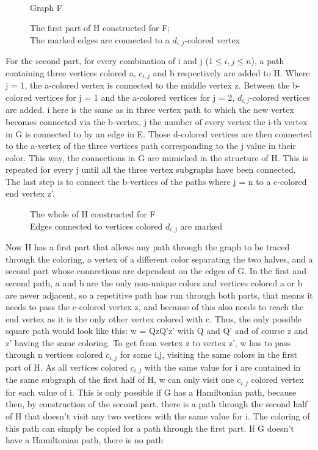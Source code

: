 \documentclass[12pt,a4paper]{article}
\begin{document}
\begin{figure}[h]
\begin{minipage}{0.2\linewidth}
	
	\caption{\\Graph F}
\end{minipage}
\begin{minipage}{0.8\linewidth}
	
	\caption{The first part of H constructed for F; \\The marked edges are connected to a $d_{i,j}$-colored vertex}
\end{minipage}
\end{figure}
\newline
 For the second part, for every combination of i and j ($1 \leq i, j \leq n$), a path containing three vertices colored a, $c_{i,j}$ and b respectively are added to H. Where j = 1, the a-colored vertex is connected to the middle vertex z. Between the b-colored vertices for j = 1 and the a-colored vertices for j = 2, $d_{i,j}$-colored vertices are added. i here is the same as in three vertex path to which the new vertex becomes connected via the b-vertex, j the number of every vertex the i-th vertex in G is connected to by an edge in E. Those d-colored vertices are then connected to the a-vertex of the three vertices path corresponding to the j value in their color. This way, the connections in G are mimicked in the structure of H. This is repeated for every j until all the three vertex subgraphs have been connected. The last step is to connect the b-vertices of the paths where j = n to a c-colored end vertex z'. 
\begin{figure}[h]
	
	\caption{The whole of H constructed for F \\ Edges connected to vertices colored $d_{i,j}$ are marked}
\end{figure}
\newpage
Now H has a first part that allows any path through the graph to be traced through the coloring, a vertex of a different color separating the two halves, and a second part whose connections are dependent on the edges of G. In the first and second path, a and b are the only non-unique colors and vertices colored a or b are never adjacent, so a repetitive path has run through both parts, that means it needs to pass the c-colored vertex z, and because of this also needs to reach the end vertex as it is the only other vertex colored with c. Thus, the only possible square path would look like this: w = QzQ'z' with Q and Q' and of course z and z' having the same coloring. To get from vertex z to vertex z', w has to pass through n vertices colored $c_{i,j}$ for some i,j, visiting the same colors in the first part of H. As all vertices colored $c_{i,j}$ with the same value for i are contained in the same subgraph of the first half of H, w can only visit one $c_{i,j}$ colored vertex for each value of i. This is only possible if G has a Hamiltonian path, because then, by construction of the second part, there is a path through the second half of H that doesn't visit any two vertices with the same value for i. The coloring of this path can simply be copied for a path through the first part. If G doesn't have a Hamiltonian path, there is no path 
\end{document}
